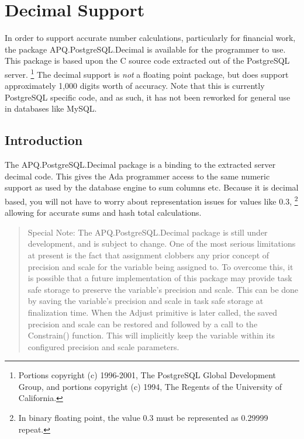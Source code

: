 \documentclass[english,letterpaper]{book}
\begin{document}
\chapter{Decimal Support}

In order to support accurate number calculations, particularly for
financial work, the package APQ\-.PostgreSQL\-.Decimal
is available for the programmer to use. This package is based upon
the C source code extracted out of the PostgreSQL server.%
\footnote{Portions copyright (c) 1996-2001, The PostgreSQL Global Development
Group, and portions copyright (c) 1994, The Regents of the University
of California.%
} The decimal support is \emph{not} a floating
point package, but does support approximately
1,000 digits worth of accuracy. Note that this is currently PostgreSQL
specific code, and as such, it has not been reworked for general use
in databases like MySQL.


\section{Introduction}

The APQ\-.PostgreSQL\-.Decimal package is a binding to the extracted server
decimal code. This gives the Ada programmer access to the same numeric
support as used by the database engine to
sum columns etc. Because it is decimal based, you will not have to
worry about representation issues for values like 0.3,%
\footnote{In binary floating point, the value 0.3 must be represented as 0.29999
repeat.} allowing for accurate sums and hash total calculations.


\begin{quote}
Special Note: The APQ\-.PostgreSQL\-.Decimal package is still under development,
and is subject to change. One of the most serious limitations at present
is the fact that assignment clobbers any prior concept of precision
and scale for the variable being assigned to. To overcome this, it
is possible that a future implementation of this package may provide
task safe storage to preserve the variable's precision and scale.
This can be done by saving the variable's precision and scale in task
safe storage at finalization time. When the Adjust primitive is later
called, the saved precision and scale can be restored and followed
by a call to the Constrain() function. This will implicitly keep the
variable within its configured precision and scale parameters.
\end{quote}
\end{document}
